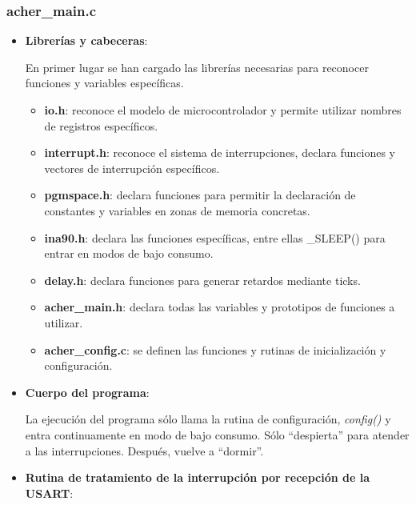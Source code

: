 \subsubsection{acher\_main.c}

\begin{itemize}
\item{\textbf{Librerías y cabeceras}:
  

  En primer lugar se han cargado las librerías necesarias para reconocer funciones y variables específicas.
  \begin{itemize}
    \item{\textbf{io.h}: reconoce el modelo de microcontrolador y permite utilizar nombres de registros específicos.}
    \item{\textbf{interrupt.h}: reconoce el sistema de interrupciones, declara funciones y vectores de interrupción específicos.}
    \item{\textbf{pgmspace.h}: declara funciones para permitir la declaración de constantes y variables en zonas de memoria concretas.}
    \item{\textbf{ina90.h}: declara las funciones específicas, entre ellas \_SLEEP() para entrar en modos de bajo consumo.}
    \item{\textbf{delay.h}: declara funciones para generar retardos mediante ticks.}
    \item{\textbf{acher\_main.h}: declara todas las variables y prototipos de funciones a utilizar.}
    \item{\textbf{acher\_config.c}: se definen las funciones y rutinas de inicialización y configuración.}
  \end{itemize}
}

\item{\textbf{Cuerpo del programa}:
  

  La ejecución del programa sólo llama la rutina de configuración, \textit{config()} y entra continuamente en modo de bajo consumo. Sólo ``despierta'' para atender a las interrupciones. Después, vuelve a ``dormir''.
}

\item{\textbf{Rutina de tratamiento de la interrupción por recepción de la USART}:
  

}
\end{itemize}
